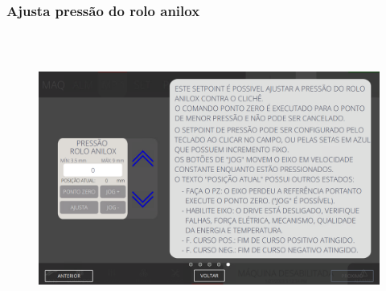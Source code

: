 \newpage
\thispagestyle{fancy}
\vspace*{40 pt}
\subsubsection{\small{Ajusta pressão do rolo anilox}}\label{ajustaPressaoRoloAnilox}
\vspace*{\fill}
\begin{figure}[h]
  \centering
  \includegraphics[width=576px,height=360px]{src/imagesFlexo/04-printter/02-printter/settings/e-5.png}
\end{figure}
\vspace*{\fill}

